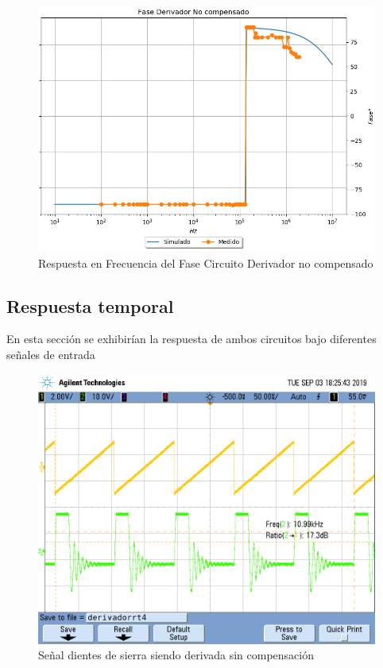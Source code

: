 \begin{figure}[H]
	\centering
	\includegraphics[width=\textwidth]{Ejercicio4/SUPERPOSICION-FASE-DERIVADOR-NO-COMPENSADO}
	\caption{Respuesta en Frecuencia del Fase Circuito Derivador no compensado}
\end{figure}

\subsection{Respuesta temporal}
En esta sección se exhibirían la respuesta de ambos circuitos bajo diferentes señales de entrada



\begin{figure}[H]
	\centering
	\includegraphics[width=\textwidth]{Ejercicio4/FOTOS-TP2-TC-EJ4/derivadorrt4}
	\caption{Señal dientes de sierra siendo derivada sin compensación}
\end{figure}

